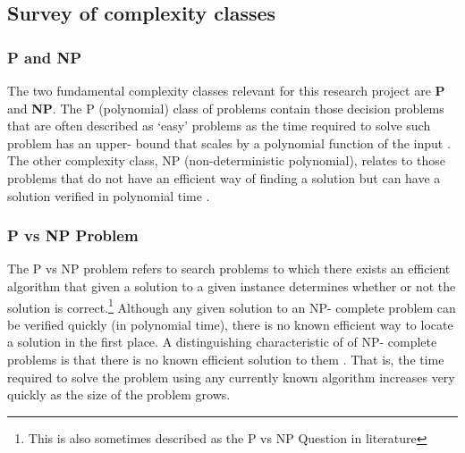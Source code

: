 \documentclass[11pt, a4paper, oneside]{report} %
\begin{document}
\subsection{Survey of complexity classes}

\subsubsection{P and NP}

The two fundamental complexity classes relevant for this research project are
\textbf{P} and \textbf{NP}\@. The P (polynomial) class of problems contain those
decision problems that are often described as `easy' problems
\cite{kendall2008survey} as the time required to solve such problem has an
upper- bound that scales by a polynomial function of the input
\cite{sipser2012introduction}. The other complexity class, NP (non-deterministic
polynomial), relates to those problems that do not have an efficient way of
finding a solution but can have a solution verified in polynomial time
\cite{Goldreich:2008, Papadimitriou:2003:CC:1074100.1074233}.





\subsubsection{P vs NP Problem}

The P vs NP problem refers to search problems to which there exists an efficient
algorithm that given a solution to a given instance determines whether or not
the solution is correct\cite{sipser2012introduction,Goldreich:2008,
kendall2008survey,du2011theory}.\footnote{This is also sometimes described as
the P vs NP Question in literature} Although any given solution to an NP-
complete problem can be verified quickly (in polynomial time), there is no known
efficient way to locate a solution in the first place. A distinguishing
characteristic of of NP- complete problems is that there is no known efficient
solution to them \cite{Goldreich:2008}. That is, the time required to solve the
problem using any currently known algorithm increases very quickly as the size
of the problem grows.
\end{document}

